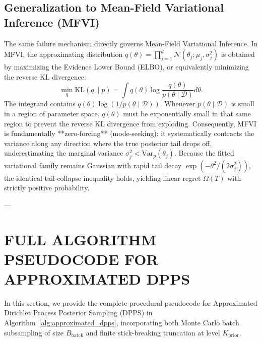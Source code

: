 \documentclass[twoside]{article}
\newcommand{\KL}{\text{KL}}
\begin{document}
\subsection{Generalization to Mean-Field Variational Inference (MFVI)}
The same failure mechanism directly governs Mean-Field Variational Inference. In MFVI, the approximating distribution $q(\theta) = \prod_{j=1}^d \mathcal{N}(\theta_j; \mu_j, \sigma_j^2)$ is obtained by maximizing the Evidence Lower Bound (ELBO), or equivalently minimizing the reverse KL divergence:
\begin{equation}
\min_q \KL(q \parallel p) = \int q(\theta) \log \frac{q(\theta)}{p(\theta \mid \mathcal{D})} d\theta.
\end{equation}
The integrand contains $q(\theta) \log(1 / p(\theta \mid \mathcal{D}))$. Whenever $p(\theta \mid \mathcal{D})$ is small in a region of parameter space, $q(\theta)$ must be exponentially small in that same region to prevent the reverse KL divergence from exploding. Consequently, MFVI is fundamentally **zero-forcing** (mode-seeking): it systematically contracts the variance along any direction where the true posterior tail drops off, underestimating the marginal variance $\sigma_j^2 < \text{Var}_p(\theta_j)$. Because the fitted variational family remains Gaussian with rapid tail decay $\exp(-\theta^2 / (2\sigma_j^2))$, the identical tail-collapse inequality holds, yielding linear regret $\Omega(T)$ with strictly positive probability.

---

\section{FULL ALGORITHM PSEUDOCODE FOR APPROXIMATED DPPS}
\label{app:algorithm_dpps}

In this section, we provide the complete procedural pseudocode for Approximated Dirichlet Process Posterior Sampling (DPPS) in Algorithm~\ref{alg:approximated_dpps}, incorporating both Monte Carlo batch subsampling of size $B_{\text{batch}}$ and finite stick-breaking truncation at level $K_{\text{prior}}$.
\end{document}
